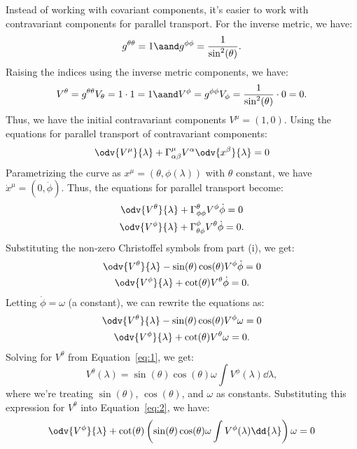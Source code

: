 \begin{solution}[(ii)]
  Instead of working with covariant components, it's easier to work with contravariant components for parallel transport. For the inverse metric, we have:
  \[%
    g^{\theta\theta} = 1 \aand g^{\phi\phi} = \frac{1}{\sin^2(\theta)}
  .\]%
  Raising the indices using the inverse metric components, we have:
  \[%
    V^\theta = g^{\theta\theta} V_\theta = 1 \cdot 1 = 1 \aand V^\phi = g^{\phi\phi} V_\phi = \frac{1}{\sin^2(\theta)} \cdot 0 = 0
  .\]%
  Thus, we have the initial contravariant components $V^\mu = (1, 0)$. Using the equations for parallel transport of contravariant components:
  \begin{equation}\label{eq:parallel_transport}
    \odv{V^\mu}{\lambda} + \Gamma_{\alpha\beta}^\mu V^\alpha \odv{x^\beta}{\lambda} = 0
  \end{equation}
  Parametrizing the curve as $x^\mu = (\theta, \phi(\lambda))$ with $\theta$ constant, we have $\dot{x}^\mu = (0, \dot{\phi})$. Thus, the equations for parallel transport become:
  \begin{gather*}
    \odv{V^\theta}{\lambda} + \Gamma_{\phi\phi}^\theta V^\phi \dot{\phi} = 0 \\
    \odv{V^\phi}{\lambda} + \Gamma_{\theta\phi}^\phi V^\theta \dot{\phi} = 0
  .\end{gather*}
  Substituting the non-zero Christoffel symbols from part (i), we get:
  \begin{gather*}
    \odv{V^\theta}{\lambda} - \sin(\theta)\cos(\theta) V^\phi \dot{\phi} = 0 \\
    \odv{V^\phi}{\lambda} + \cot(\theta) V^\theta \dot{\phi} = 0
  .\end{gather*}
  Letting $\dot{\phi} = \omega$ (a constant), we can rewrite the equations as:
  \begin{gather}
    \odv{V^\theta}{\lambda} - \sin(\theta)\cos(\theta) V^\phi \omega = 0\label{eq:1} \\
    \odv{V^\phi}{\lambda} + \cot(\theta) V^\theta \omega = 0\label{eq:2}
  .\end{gather}
  Solving for $V^\theta$ from Equation~\eqref{eq:1}, we get:
  \[%
    V^\theta(\lambda) = \sin(\theta)\cos(\theta) \omega \int V^\phi(\lambda) \dd{\lambda}
  ,\]%
  where we're treating $\sin(\theta)$, $\cos(\theta)$, and $\omega$ as constants. Substituting this expression for $V^\theta$ into Equation~\eqref{eq:2}, we have:
  \begin{equation}\label{eq:3}
    \odv{V^\phi}{\lambda} + \cot(\theta) \left(\sin(\theta)\cos(\theta) \omega \int V^\phi(\lambda) \dd{\lambda}\right) \omega = 0

\end{equation}
\end{solution}
